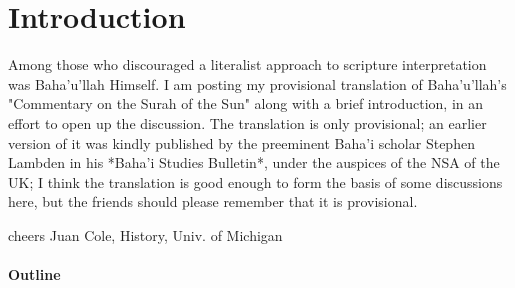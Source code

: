 \documentclass[12pt]{article}
\begin{document}
\maketitle

\section{Introduction}
Among those who discouraged a literalist approach to scripture 
interpretation was Baha'u'llah Himself. I am posting my provisional 
translation of Baha'u'llah's "Commentary on the Surah of the Sun" along 
with a brief introduction, in an effort to open up the discussion. The 
translation is only provisional; an earlier version of it was kindly 
published by the preeminent Baha'i scholar Stephen Lambden in his *Baha'i 
Studies Bulletin*, under the auspices of the NSA of the UK; I think the 
translation is good enough to form the basis of some discussions here, 
but the friends should please remember that it is provisional. 

cheers Juan Cole, History, Univ. of Michigan 

\paragraph{Outline}
\end{document}

